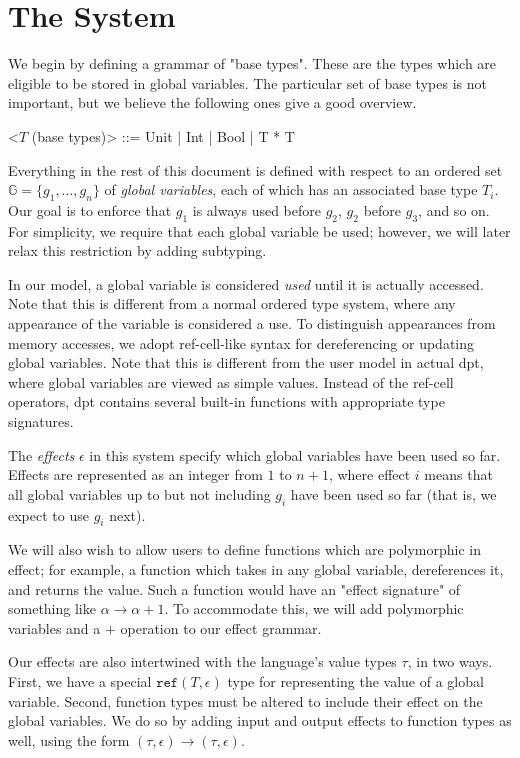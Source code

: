 \documentclass{article}
\begin{document}
\section*{The System}
We begin by defining a grammar of "base types". These are the types which are eligible to be stored in global variables. The particular set of base types is not important, but we believe the following ones give a good overview.

\begin{grammar}
	<$T$ (base types)> ::= Unit | Int | Bool | T * T
\end{grammar}

Everything in the rest of this document is defined with respect to an ordered set $\mathbb{G} = \{g_1, \dots, g_n\}$ of \emph{global variables}, each of which has an associated base type $T_i$. Our goal is to enforce that $g_1$ is always used before $g_2$, $g_2$ before $g_3$, and so on. For simplicity, we require that each global variable be used; however, we will later relax this restriction by adding subtyping.

In our model, a global variable is considered \emph{used} until it is actually accessed. Note that this is different from a normal ordered type system, where any appearance of the variable is considered a use. To distinguish appearances from memory accesses, we adopt ref-cell-like syntax for dereferencing or updating global variables. Note that this is different from the user model in actual dpt, where global variables are viewed as simple values. Instead of the ref-cell operators, dpt contains several built-in functions with appropriate type signatures.

The \emph{effects} $\epsilon$ in this system specify which global variables have been used so far. Effects are represented as an integer from $1$ to $n+1$, where effect $i$ means that all global variables up to but not including $g_i$ have been used so far (that is, we expect to use $g_i$ next).

We will also wish to allow users to define functions which are polymorphic in effect; for example, a function which takes in any global variable, dereferences it, and returns the value. Such a function would have an "effect signature" of something like $\alpha \rightarrow \alpha + 1$. To accommodate this, we will add polymorphic variables and a $+$ operation to our effect grammar.

Our effects are also intertwined with the language's value types $\tau$, in two ways. First, we have a special $\texttt{ref} (T, \epsilon)$ type for representing the value of a global variable. Second, function types must be altered to include their effect on the global variables. We do so by adding input and output effects to function types as well, using the form $(\tau, \epsilon) \rightarrow (\tau, \epsilon)$.
\end{document}
